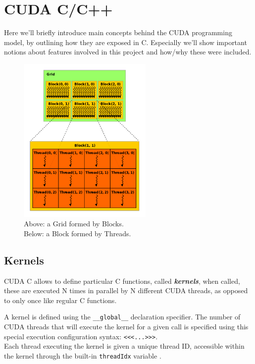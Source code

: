\section{CUDA C/C++}
	Here we'll briefly introduce main concepts behind the CUDA programming model, by outlining how they are exposed in C.
	Especially we'll show important notions about features involved in this project and how/why these were included.
	\begin{figure}
		\raggedleft
		
		\includegraphics[width=0.58\textwidth]{images/gridblocks.png}
		\caption{Above: a Grid formed by Blocks.\\ Below: a Block formed by Threads.}
		\label{fig:gridblock}
	\end{figure}
	
	\subsection{Kernels} 
	\label{subs:ker}
	CUDA C allows to define particular C functions, called \textbf{\textit{kernels}}, when called, these are executed N times in parallel by N different CUDA threads, as	opposed to only once like regular C functions.
	
	A kernel is defined using the \texttt{\_\_global\_\_} declaration specifier. The number of CUDA threads that will execute the kernel for a given call is specified using this special execution configuration syntax: 
	\texttt{<<<...>>>}.\\
	Each thread executing the kernel is given a unique thread ID, accessible within the kernel through the built-in \texttt{threadIdx} variable \cite{cudaguide}.

